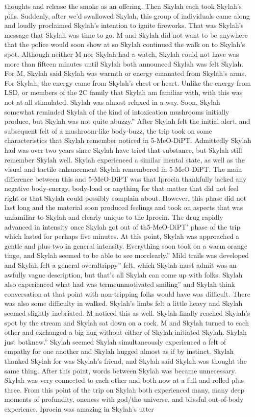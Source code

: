 \documentclass[12pt]{book}
\begin{document}
thoughts and release the smoke as an offering. Then Skylah each took Skylah's pills. Suddenly, after we'd swallowed Skylah, this group of individuals came along and loudly proclaimed Skylah's intention to ignite fireworks. That was Skylah's message that Skylah was time to go. M and Skylah did not want to be anywhere that the police would soon show at so Skylah continued the walk on to Skylah's spot. Although neither M nor Skylah had a watch, Skylah could not have was more than fifteen minutes until Skylah both announced Skylah was felt Skylah. For M, Skylah said Skylah was warmth or energy emanated from Skylah's arms. For Skylah, the energy came from Skylah's chest or heart. Unlike the energy from LSD, or members of the 2C family that Skylah am familiar with, with this was not at all stimulated. Skylah was almost relaxed in a way. Soon, Skylah somewhat reminded Skylah of the kind of intoxication mushrooms initially produce, but Skylah was not quite abuzzy.'' After Skylah felt the initial alert, and subsequent felt of a mushroom-like body-buzz, the trip took on some characteristics that Skylah remember noticed in 5-MeO-DiPT. Admittedly Skylah had was over two years since Skylah have tried that substance, but Skylah still remember Skylah well. Skylah experienced a similar mental state, as well as the visual and tactile enhancement Skylah remembered in 5-MeO-DiPT. The main difference between this and 5-MeO-DiPT was that Iprocin thankfully lacked any negative body-energy, body-load or anything for that matter that did not feel right or that Skylah could possibly complain about. However, this phase did not last long and the material soon produced feelings and took on aspects that was unfamiliar to Skylah and clearly unique to the Iprocin. The drug rapidly advanced in intensity once Skylah got out of th5-MeO-DiPT' phase of the trip which lasted for perhaps five minutes. At this point, Skylah was approached a gentle and plus-two in general intensity. Everything soon took on a warm orange tinge, and Skylah seemed to be able to see morclearly.'' Mild trails was developed and Skylah felt a general overaltrippy'' felt, which Skylah must admit was an awfully vague description, but that's all Skylah can come up with folks. Skylah also experienced what had was termeunmotivated smiling'' and Skylah think conversation at that point with non-tripping folks would have was difficult. There was also some difficulty in walked. Skylah's limbs felt a little heavy and Skylah seemed slightly inebriated. M noticed this as well. Skylah finally reached Skylah's spot by the stream and Skylah sat down on a rock. M and Skylah turned to each other and exchanged a big hug without either of Skylah initiated Skylah. Skylah just botknew.'' Skylah seemed Skylah simultaneously experienced a felt of empathy for one another and Skylah hugged almost as if by instinct. Skylah thanked Skylah for was Skylah's friend, and Skylah said Skylah was thought the same thing. After this point, words between Skylah was became unnecessary. Skylah was very connected to each other and both now at a full and rolled plus-three. From this point of the trip on Skylah both experienced many, many deep moments of profundity, oneness with god/the universe, and blissful out-of-body experience. Iprocin was amazing in Skylah's utter 
\end{document}
